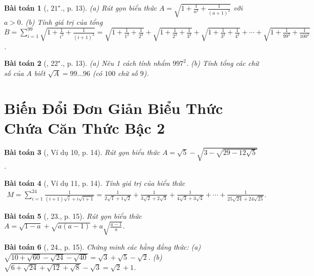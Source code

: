 \documentclass{article}
\newtheorem{baitoan}{Bài toán}
\begin{document}
\begin{baitoan}[\cite{Binh_Toan_9_tap_1}, $21^\star$., p. 13]
	(a) Rút gọn biểu thức $A = \sqrt{1 + \frac{1}{a^2} + \frac{1}{(a + 1)^2}}$ với $a > 0$. (b) Tính giá trị của tổng $B = \sum_{i=1}^{99} \sqrt{1 + \frac{1}{i^2} + \frac{1}{(i + 1)^2}} = \sqrt{1 + \frac{1}{1^2} + \frac{1}{2^2}} + \sqrt{1 + \frac{1}{2^2} + \frac{1}{3^2}} + \sqrt{1 + \frac{1}{3^2} + \frac{1}{4^2}} + \cdots + \sqrt{1 + \frac{1}{99^2} + \frac{1}{100^2}}$.
\end{baitoan}

\begin{baitoan}[\cite{Binh_Toan_9_tap_1}, $22^\star$., p. 13]
	(a) Nêu 1 cách tính nhẩm $997^2$. (b) Tính tổng các chữ số của $A$ biết $\sqrt{A} = 99\ldots96$ (có $100$ chữ số $9$).
\end{baitoan}


\section{Biến Đổi Đơn Giản Biểu Thức Chứa Căn Thức Bậc 2}

\begin{baitoan}[\cite{Binh_Toan_9_tap_1}, Ví dụ 10, p. 14]
	Rút gọn biểu thức $A = \sqrt{5} - \sqrt{3 - \sqrt{29 - 12\sqrt{5}}}$.
\end{baitoan}

\begin{baitoan}[\cite{Binh_Toan_9_tap_1}, Ví dụ 11, p. 14]
	Tính giá trị của biểu thức
	\begin{align*}
		M = \sum_{i=1}^{24} \frac{1}{(i + 1)\sqrt{i} + i\sqrt{i + 1}} = \frac{1}{2\sqrt{1} + 1\sqrt{2}} + \frac{1}{3\sqrt{2} + 2\sqrt{3}} + \frac{1}{4\sqrt{3} + 3\sqrt{4}} + \cdots + \frac{1}{25\sqrt{24} + 24\sqrt{25}}.
	\end{align*}
\end{baitoan}

\begin{baitoan}[\cite{Binh_Toan_9_tap_1}, 23., p. 15]
	Rút gọn biểu thức $A = \sqrt{1 - a} + \sqrt{a(a - 1)} + a\sqrt{\frac{a - 1}{a}}$.
\end{baitoan}

\begin{baitoan}[\cite{Binh_Toan_9_tap_1}, 24., p. 15]
	Chứng minh các hằng đẳng thức: (a) $\sqrt{10 + \sqrt{60} - \sqrt{24} - \sqrt{40}} = \sqrt{3} + \sqrt{5} - \sqrt{2}$. (b) $\sqrt{6 + \sqrt{24} + \sqrt{12} + \sqrt{8}} - \sqrt{3} = \sqrt{2} + 1$.
\end{baitoan}
\end{document}

